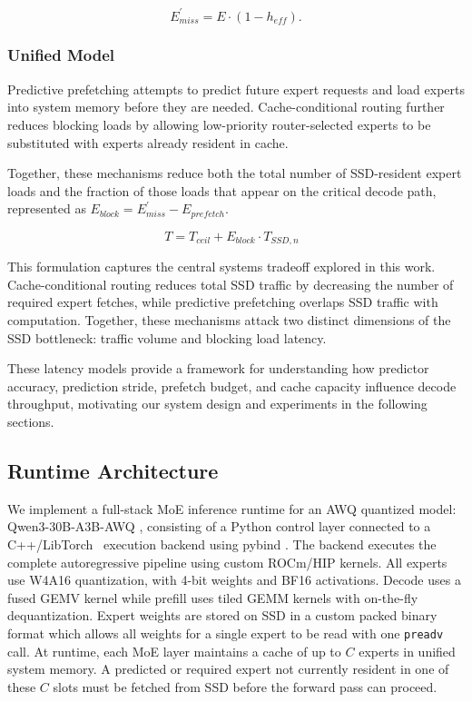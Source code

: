 \begin{equation}
    E_{miss}^{'} = E \cdot \left(1 - h_{eff}\right).
    \label{eq:route_miss}
\end{equation}

\subsubsection{Unified Model}
Predictive prefetching attempts to predict future expert requests and load experts into system memory before they are needed. Cache-conditional routing further reduces blocking loads by allowing low-priority router-selected experts to be substituted with experts already resident in cache.

Together, these mechanisms reduce both the total number of SSD-resident expert loads and the fraction of those loads that appear on the critical decode path, represented as $E_{block} = E_{miss}^{'} - E_{prefetch}$.

\begin{equation}
    \label{eq:unified_full}
    T =
    T_{ceil}
    +
    E_{block} \cdot T_{SSD,n} \,\,\,\,
\end{equation}

This formulation captures the central systems tradeoff explored in this work. Cache-conditional routing reduces total SSD traffic by decreasing the number of required expert fetches, while predictive prefetching overlaps SSD traffic with computation. Together, these mechanisms attack two distinct dimensions of the SSD bottleneck: traffic volume and blocking load latency.

These latency models provide a framework for understanding how predictor accuracy, prediction stride, prefetch budget, and cache capacity influence decode throughput, motivating our system design and experiments in the following sections.

\subsection{Runtime Architecture}
We implement a full-stack MoE inference runtime for an AWQ \cite{lin2026awqactivationawareweightquantization} quantized model: Qwen3-30B-A3B-AWQ \cite{QuixiAIQwen3AWQ}, consisting of a Python control layer connected to a C++/LibTorch~\cite{pytorch} execution backend using pybind \cite{pybind11}. The backend executes the complete autoregressive pipeline using custom ROCm/HIP \cite{rocm} kernels. All experts use W4A16 quantization, with 4-bit weights and BF16 activations. Decode uses a fused GEMV kernel while prefill uses tiled GEMM kernels with on-the-fly dequantization. Expert weights are stored on SSD in a custom packed binary format which allows all weights for a single expert to be read with one \texttt{preadv} call. At runtime, each MoE layer maintains a cache of up to $C$ experts in unified system memory. A predicted or required expert not currently resident in one of these $C$ slots must be fetched from SSD before the forward pass can proceed.  


